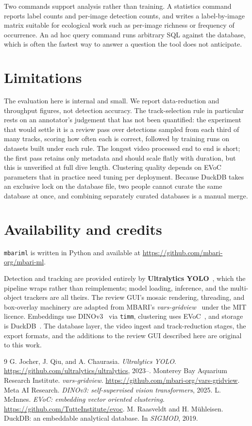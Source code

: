 \documentclass[10pt,letterpaper]{article}
\newcommand{\code}[1]{\texttt{\small #1}}
\begin{document}
Two commands support analysis rather than training. A statistics command reports
label counts and per-image detection counts, and writes a label-by-image matrix
suitable for ecological work such as per-image richness or frequency of
occurrence. An ad hoc query command runs arbitrary SQL against the database,
which is often the fastest way to answer a question the tool does not
anticipate.

\section{Limitations}

The evaluation here is internal and small. We report data-reduction and
throughput figures, not detection accuracy. The track-selection rule in
particular rests on an annotator's judgement that has not been quantified: the
experiment that would settle it is a review pass over detections sampled from
each third of many tracks, scoring how often each is correct, followed by
training runs on datasets built under each rule. The longest video
processed end to end is short; the first pass retains only metadata and should
scale flatly with duration, but this is unverified at full dive length.
Clustering quality depends on EVoC parameters that in practice need tuning per
deployment. Because DuckDB takes an exclusive lock on the database file, two
people cannot curate the same database at once, and combining separately curated
databases is a manual merge.

\section{Availability and credits}

\code{mbariml} is written in Python and available at
\url{https://github.com/mbari-org/mbari-ml}.

Detection and tracking are provided entirely by \textbf{Ultralytics
YOLO}~\cite{ultralytics}, which the pipeline wraps rather than reimplements;
model loading, inference, and the multi-object trackers are all theirs. The
review GUI's mosaic rendering, threading, and box-overlay machinery are adapted
from MBARI's \emph{vars-gridview}~\cite{varsgridview} under the MIT licence.
Embeddings use DINOv3~\cite{dinov3} via \code{timm}, clustering uses
EVoC~\cite{evoc}, and storage is DuckDB~\cite{duckdb}. The database layer, the
video ingest and track-reduction stages, the export formats, and the additions
to the review GUI described here are original to this work.

\begin{thebibliography}{9}\small
{} G. Jocher, J. Qiu, and A. Chaurasia. \emph{Ultralytics
YOLO}. \url{https://github.com/ultralytics/ultralytics}, 2023--.
 Monterey Bay Aquarium Research Institute.
\emph{vars-gridview}. \url{https://github.com/mbari-org/vars-gridview}.
 Meta AI Research. \emph{DINOv3: self-supervised vision
transformers}, 2025.
 L. McInnes. \emph{EVoC: embedding vector oriented clustering}.
\url{https://github.com/TutteInstitute/evoc}.
 M. Raasveldt and H. M\"uhleisen. DuckDB: an embeddable
analytical database. In \emph{SIGMOD}, 2019.
\end{thebibliography}
\end{document}
